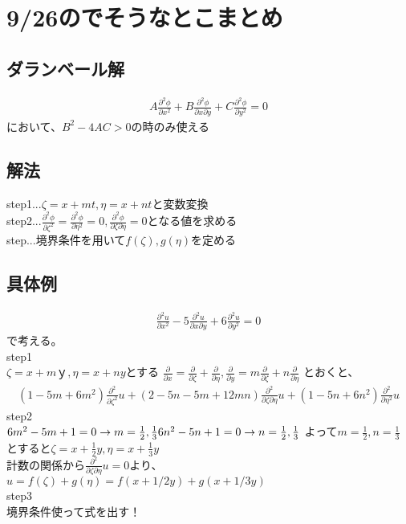 \documentclass[titlepage,dvipdfmx]{jsarticle}
\begin{document}
\section{9/26のでそうなとこまとめ}

  \subsection{ダランベール解}
    \begin{eqnarray}
      \displaystyle
      A\frac{\partial^2 \phi}{\partial x^2}+B\frac{\partial^2 \phi}{\partial x \partial y}+C\frac{\partial^2 \phi}{\partial y^2}=0 \nonumber
    \end{eqnarray}
    において、$B^2-4AC>0$の時のみ使える

  \subsection{解法}
    \noindent
    step1...$\zeta=x+mt,\eta =x+nt $と変数変換\\
    step2...$\frac{\partial^2 \phi}{\partial \zeta^2}=\frac{\partial^2 \phi}{\partial \eta^2}=0,\frac{\partial^2 \phi}{\partial \zeta \partial \eta} \!=0$となる値を求める\\
    step...境界条件を用いて$f(\zeta),g(\eta)$を定める
    
  \subsection{具体例}
    \begin{eqnarray}
      \displaystyle
      \frac{\partial^2 u}{\partial x^2}-5\frac{\partial^2 u}{\partial x \partial y}+6\frac{\partial^2 u}{\partial y^2}=0 \nonumber
    \end{eqnarray}
    で考える。\\
    step1\\
    $\zeta=x+mｙ,\eta=x+ny$とする
    $\frac{\partial}{\partial x}=\frac{\partial}{\partial \zeta}+\frac{\partial}{\partial \eta},
    \frac{\partial}{\partial y}=m\frac{\partial}{\partial \zeta}+n\frac{\partial}{\partial \eta}$
    とおくと、\\
    \begin{eqnarray}
      \displaystyle
      \left( 1-5m+6m^2 \right) \frac{\partial^2 }{\partial \zeta^2}u+\left( 2-5n-5m+12mn \right) \frac{\partial^2}{\partial \zeta \partial \eta}u+\left( 1-5n+6n^2\right) \frac{\partial^2 }{\partial \eta^2}u \nonumber
    \end{eqnarray}
    step2\\
    $6m^2-5m+1=0 \rightarrow m=\frac{1}{2},\frac{1}{3}\\
     6n^2-5n+1=0 \rightarrow n=\frac{1}{2},\frac{1}{3}$
    よって$m=\frac{1}{2},n=\frac{1}{3}$とすると$\zeta=x+\frac{1}{2}y,\eta=x+\frac{1}{3}y$\\
    計数の関係から$\frac{\partial^2}{\partial \zeta \partial\eta}u=0$より、$u=f(\zeta)+g(\eta)=f(x+1/2y)+g(x+1/3y)$\\
    step3 \\
    境界条件使って式を出す！
\end{document}

